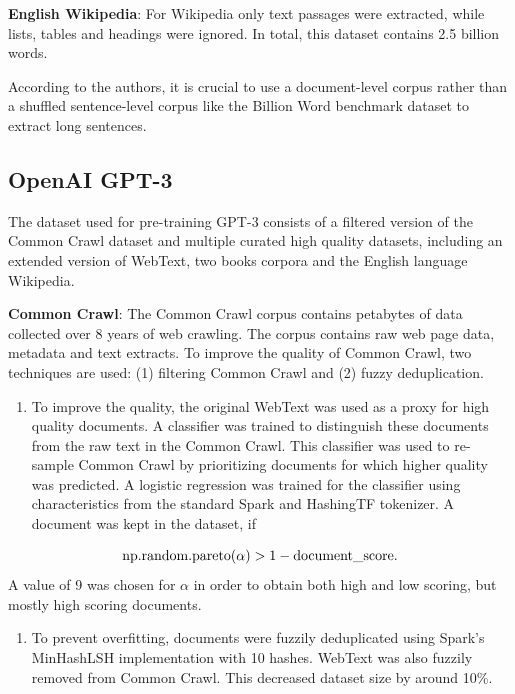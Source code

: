 \documentclass[]{krantz}
\providecommand{\tightlist}{%
  \setlength{\itemsep}{0pt}\setlength{\parskip}{0pt}}
\begin{document}
\textbf{English Wikipedia}: For Wikipedia only text passages were extracted, while lists, tables and headings were ignored. In total, this dataset contains 2.5 billion words.

According to the authors, it is crucial to use a document-level corpus rather than a shuffled sentence-level corpus like the Billion Word benchmark dataset to extract long sentences. \citep{bert}

\hypertarget{openai-gpt-3}{%
\subsection{OpenAI GPT-3}\label{openai-gpt-3}}

The dataset used for pre-training GPT-3 consists of a filtered version of the Common Crawl dataset and multiple curated high quality datasets, including an extended version of WebText, two books corpora and the English language Wikipedia.

\textbf{Common Crawl}: The Common Crawl corpus contains petabytes of data collected over 8 years of web crawling. The corpus contains raw web page data, metadata and text extracts. To improve the quality of Common Crawl, two techniques are used: (1) filtering Common Crawl and (2) fuzzy deduplication.

\begin{enumerate}
\def\labelenumi{\arabic{enumi}.}
\tightlist
\item
  To improve the quality, the original WebText was used as a proxy for high quality documents. A classifier was trained to distinguish these documents from the raw text in the Common Crawl. This classifier was used to re-sample Common Crawl by prioritizing documents for which higher quality was predicted. A logistic regression was trained for the classifier using characteristics from the standard Spark and HashingTF tokenizer. A document was kept in the dataset, if
\end{enumerate}

\[\hbox{np.random.pareto}(\alpha) > 1 - \hbox{document\_score}.\] A value of 9 was chosen for \(\alpha\) in order to obtain both high and low scoring, but mostly high scoring documents.

\begin{enumerate}
\def\labelenumi{\arabic{enumi}.}
\setcounter{enumi}{1}
\tightlist
\item
  To prevent overfitting, documents were fuzzily deduplicated using Spark's MinHashLSH implementation with 10 hashes. WebText was also fuzzily removed from Common Crawl. This decreased dataset size by around 10\%.
\end{enumerate}
\end{document}

